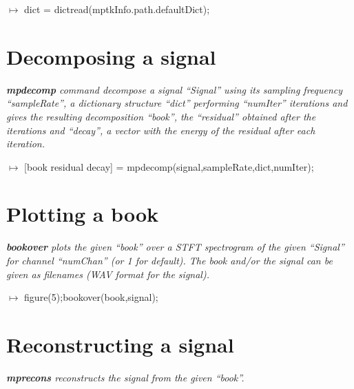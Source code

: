 \vspace{0.2 cm}

\noindent $\mapsto$ dict = dictread(mptkInfo.path.defaultDict);

\section{Decomposing a signal}

\textcolor[rgb]{0.4,0.4,0.4}{\emph{\textbf{mpdecomp} command decompose a signal ``Signal'' using its sampling frequency ``sampleRate'', 
a dictionary structure ``dict'' performing ``numIter'' iterations and  gives the resulting decomposition ``book'', the ``residual'' obtained after 
the iterations and ``decay'', a vector with the energy of the residual after each iteration.}}

\vspace{0.2 cm}

\noindent $\mapsto$ [book residual decay] = mpdecomp(signal,sampleRate,dict,numIter);

\section{Plotting a book}

\textcolor[rgb]{0.4,0.4,0.4}{\emph{\textbf{bookover} plots the given ``book'' over a STFT spectrogram of the given ``Signal'' for  channel ``numChan'' 
(or 1 for default). The book and/or the signal can be given as  filenames (WAV format for the signal).}}

\vspace{0.2 cm}

\noindent $\mapsto$ figure(5);bookover(book,signal);

\section{Reconstructing a signal}

\textcolor[rgb]{0.4,0.4,0.4}{\emph{\textbf{mprecons} reconstructs the signal from the given ``book''.}}

